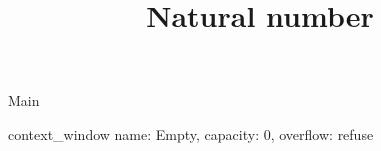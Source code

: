 \begin{lexlean}{Main}
\title{Natural number}
\begin{semanticmodule}
context_window{
  name: Empty,
  capacity: 0,
  overflow: refuse
}
\end{semanticmodule}
\end{lexlean}
